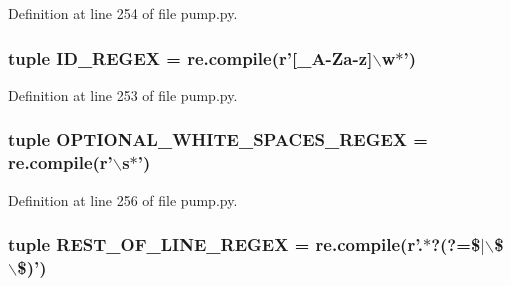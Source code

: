\-Definition at line 254 of file pump.\-py.

\hypertarget{namespacepump_a72ec68ae8b1a6794caed2e023ad35d0d}{
\subsubsection[{\-I\-D\-\_\-\-R\-E\-G\-E\-X}]{\setlength{\rightskip}{0pt plus 5cm}tuple {\bf \-I\-D\-\_\-\-R\-E\-G\-E\-X} = re.\-compile(r'\mbox{[}\-\_\-\-A-\/\-Za-\/z\mbox{]}$\backslash$w$\ast$')}}\label{df/d92/namespacepump_a72ec68ae8b1a6794caed2e023ad35d0d}


\-Definition at line 253 of file pump.\-py.

\hypertarget{namespacepump_a72547bba10d6b0d28381a17d46fcddff}{
\subsubsection[{\-O\-P\-T\-I\-O\-N\-A\-L\-\_\-\-W\-H\-I\-T\-E\-\_\-\-S\-P\-A\-C\-E\-S\-\_\-\-R\-E\-G\-E\-X}]{\setlength{\rightskip}{0pt plus 5cm}tuple {\bf \-O\-P\-T\-I\-O\-N\-A\-L\-\_\-\-W\-H\-I\-T\-E\-\_\-\-S\-P\-A\-C\-E\-S\-\_\-\-R\-E\-G\-E\-X} = re.\-compile(r'$\backslash$s$\ast$')}}\label{df/d92/namespacepump_a72547bba10d6b0d28381a17d46fcddff}


\-Definition at line 256 of file pump.\-py.

\hypertarget{namespacepump_a3a8b691d5bf29c19ae673e3f3b8aeb03}{
\subsubsection[{\-R\-E\-S\-T\-\_\-\-O\-F\-\_\-\-L\-I\-N\-E\-\_\-\-R\-E\-G\-E\-X}]{\setlength{\rightskip}{0pt plus 5cm}tuple {\bf \-R\-E\-S\-T\-\_\-\-O\-F\-\_\-\-L\-I\-N\-E\-\_\-\-R\-E\-G\-E\-X} = re.\-compile(r'.$\ast$?(?=\$$|$$\backslash$\$$\backslash$\$)')}}\label{df/d92/namespacepump_a3a8b691d5bf29c19ae673e3f3b8aeb03}


